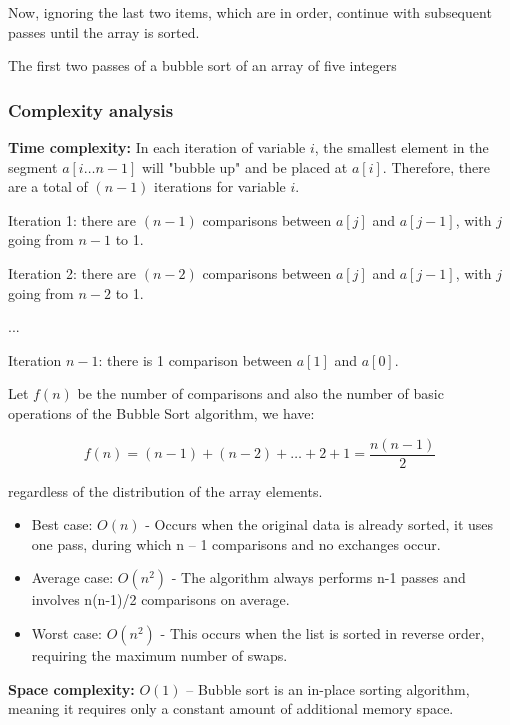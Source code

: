 Now, ignoring the last two items, which are in order, continue with subsequent passes until the array is sorted.

The first two passes of a bubble sort of an array of five integers ~\cite{ref7}

\vspace{5pt}

\subsubsection{Complexity analysis}
\textbf{Time complexity:}
In each iteration of variable \(i\), the smallest element in the segment \(a[i \ldots n-1]\) will "bubble up" and be placed at \(a[i]\). Therefore, there are a total of \((n-1)\) iterations for variable \(i\).

Iteration 1: there are \((n-1)\) comparisons between \(a[j]\) and \(a[j-1]\), with \(j\) going from \(n-1\) to 1.

Iteration 2: there are \((n-2)\) comparisons between \(a[j]\) and \(a[j-1]\), with \(j\) going from \(n-2\) to 1.

...

Iteration \(n-1\): there is 1 comparison between \(a[1]\) and \(a[0]\).

Let \(f(n)\) be the number of comparisons and also the number of basic operations of the Bubble Sort algorithm, we have:

\[ f(n) = (n-1) + (n-2) + \ldots + 2 + 1 = \frac{n(n-1)}{2} \]

regardless of the distribution of the array elements.
\begin{itemize}
    \item Best case: $O(n)$ - Occurs when the original data is already sorted, it uses one pass, during which n – 1 comparisons and no exchanges occur. ~\cite{ref7}
    \item Average case: $O(n^2)$ - The algorithm always performs n-1 passes and involves n(n-1)/2 comparisons on average.
    \item Worst case: $O(n^2)$ - This occurs when the list is sorted in reverse order, requiring the maximum number of swaps.
\end{itemize}

\textbf{Space complexity:} $O(1)$ – Bubble sort is an in-place sorting algorithm, meaning it requires only a constant amount of additional memory space.

\vspace{5pt}

